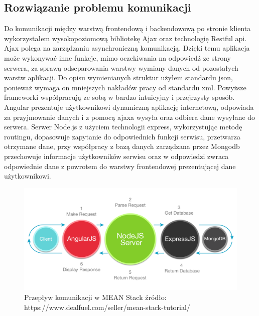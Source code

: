 \documentclass[12pt]{report}
\begin{document}
\subsection{Rozwiązanie problemu komunikacji}
Do komunikacji między warstwą frontendową i backendowową po stronie klienta wykorzystałem wysokopoziomową bibliotekę Ajax oraz technologię Restful api. 
Ajax polega na zarządzaniu asynchroniczną komunikacją. 
Dzięki temu aplikacja może wykonywać inne funkcje, mimo oczekiwania na odpowiedź ze strony serwera, za sprawą odseparowania warstwy wymiany danych od pozostałych warstw aplikacji.
Do opisu wymienianych struktur użyłem standardu json, ponieważ wymaga on mniejszych nakładów pracy od standardu xml. 
Powyższe frameworki współpracują ze sobą w bardzo intuicyjny i przejrzysty sposób. 
Angular prezentuje użytkownikowi dynamiczną aplikację internetową, odpowiada za przyjmowanie danych i z pomocą ajaxa wysyła oraz odbiera dane wysyłane do serwera. 
Serwer Node.js z użyciem technologii express, wykorzystując metodę routingu, dopasowuje zapytanie do odpowiednich funkcji serwisu, przetwarza otrzymane dane, przy współpracy z bazą danych zarządzana przez Mongodb przechowuje informacje użytkowników serwisu oraz w odpowiedzi zwraca odpowiednie dane z powrotem do warstwy frontendowej prezentującej dane użytkownikowi. 
\newpage
\begin{figure}[!hb]
\centering
\includegraphics[width=\textwidth,height=\textheight,keepaspectratio]{Meanex.png}
\caption{Przepływ komunikacji w MEAN Stack źródło: https://www.dealfuel.com/seller/mean-stack-tutorial/}
\end{figure}
\end{document}

